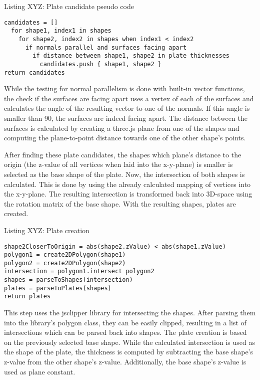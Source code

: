 \documentclass[../ClassicThesis.tex]{subfiles}
\begin{document}
\begin{center}Listing XYZ: Plate candidate pseudo code
\begin{lstlisting}
candidates = []
  for shape1, index1 in shapes
    for shape2, index2 in shapes when index1 < index2
      if normals parallel and surfaces facing apart
        if distance between shape1, shape2 in plate thicknesses
          candidates.push { shape1, shape2 }
return candidates
\end{lstlisting}
\end{center}

While the testing for normal parallelism is done with built-in vector functions, the check if the surfaces are facing apart uses a vertex of each of the surfaces and calculates the angle of the resulting vector to one of the normals. If this angle is smaller than 90\textdegree, the surfaces are indeed facing apart. The distance between the surfaces is calculated by creating a three.js plane from one of the shapes and computing the plane-to-point distance towards one of the other shape's points.

After finding these plate candidates, the shapes which plane's distance to the origin (the z-value of all vertices when laid into the x-y-plane) is smaller is selected as the base shape of the plate. Now, the intersection of both shapes is calculated. This is done by using the already calculated mapping of vertices into the x-y-plane. The resulting intersection is transformed back into 3D-space using the rotation matrix of the base shape. With the resulting shapes, plates are created.

\begin{center}Listing XYZ: Plate creation
\begin{lstlisting}
shape2CloserToOrigin = abs(shape2.zValue) < abs(shape1.zValue)
polygon1 = create2DPolygon(shape1)
polygon2 = create2DPolygon(shape2)
intersection = polygon1.intersect polygon2
shapes = parseToShapes(intersection)
plates = parseToPlates(shapes)
return plates
\end{lstlisting}
\end{center}

This step uses the jsclipper library for intersecting the shapes. After parsing them into the library's polygon class, they can be easily clipped, resulting in a list of intersections which can be parsed back into shapes. The plate creation is based on the previously selected base shape. While the calculated intersection is used as the shape of the plate, the thickness is computed by subtracting the base shape's z-value from the other shape's z-value. Additionally, the base shape's z-value is used as plane constant.
\end{document}
